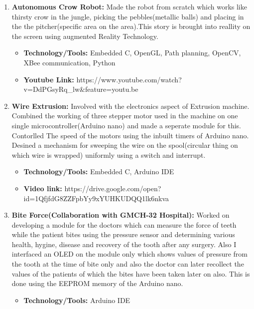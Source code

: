 \documentclass[letterpaper,11pt]{article}
\newlength{\outerbordwidth}
\newcommand{\resheading}[1]{\vspace{8pt}
  \parbox{\textwidth}{\setlength{\FrameSep}{\outerbordwidth}
    \begin{shaded}
\setlength{\fboxsep}{0pt}\framebox[\textwidth][l]{\setlength{\fboxsep}{4pt}\fcolorbox{shadecolorB}{shadecolorB}{\textbf{\sffamily{\mbox{~}\makebox[6.762in][l]{\large #1} \vphantom{p\^{E}}}}}}
    \end{shaded}
  }\vspace{-5pt}
}
\begin{document}
\resheading{Projects}
 \begin{enumerate}

\item \textbf {Autonomous Crow Robot:}
Made the robot from scratch which works like thirsty crow in the jungle, picking the pebbles(metallic balls) and placing in the the pitcher(specific area on the area).This story is brought into reallity on the screen using augmented Reality Technology. 
\begin{itemize}
\item \textbf{Technology/Tools:} Embedded C, OpenGL, Path planning, OpenCV, XBee communication, Python 
\end{itemize}
\begin{itemize}
\item \textbf{Youtube Link:} https://www.youtube.com/watch?v=DdPGsyRq_lw&feature=youtu.be
\end{itemize}

\item \textbf {Wire Extrusion:}
Involved with the electronics aspect of Extrusion machine. Combined the working of three stepper motor used in the machine on one single microcontroller(Arduino nano) and made a seperate module for this. Contorlled The speed of the motors using the inbuilt timers of Arduino nano. Desined a mechanism for sweeping the wire on the spool(circular thing on which wire is wrapped) uniformly using a switch and interrupt. 

\begin{itemize}
\item \textbf{Technology/Tools:} Embedded C, Arduino IDE
\end{itemize}
\begin{itemize}
\item \textbf{Video link:} https://drive.google.com/open?id=1QfjfdG8ZZFpbYy9xYUHKUDQQ1lk6nkva
\end{itemize}

 
  \item \textbf{Bite Force(Collaboration with GMCH-32 Hospital):} 
Worked on developing a module for the doctors which can measure the force of teeth while the patient bites using the pressure sensor and determining various health, hygine, disease and recovery of the tooth after any surgery. Also I interfaced an OLED on the module only which shows values of pressure from the tooth at the time of bite only and also the doctor can later recollect the values of the patients of which the bites have been taken later on also. This is done using the EEPROM memory of the Arduino nano.
\begin{itemize}
\item \textbf{Technology/Tools:} Arduino IDE
\end{itemize}


\end{enumerate}
\end{document}
